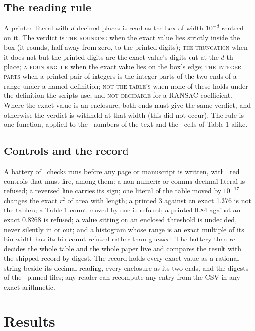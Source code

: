 \documentclass[preprint,11pt,authoryear]{elsarticle}
\begin{document}
\subsection{The reading rule}\label{sec:rule}
A printed literal with $d$ decimal places is read as the box of width $10^{-d}$ centred on it. The verdict is \textsc{the rounding} when the exact value lies strictly inside the box (it rounds, half away from zero, to the printed digits); \textsc{the truncation} when it does not but the printed digits are the exact value's digits cut at the $d$-th place; \textsc{a rounding tie} when the exact value lies on the box's edge; \textsc{the integer parts} when a printed pair of integers is the integer parts of the two ends of a range under a named definition; \textsc{not the table's} when none of these holds under the definition the scripts use; and \textsc{not decidable} for a RANSAC coefficient. Where the exact value is an enclosure, both ends must give the same verdict, and otherwise the verdict is withheld at that width (this did not occur). The rule is one function, applied to the \ItemsTotal\ numbers of the text and the \TOneCells\ cells of Table 1 alike.

\subsection{Controls and the record}
A battery of \BatteryChecks\ checks runs before any page or manuscript is written, with \BatteryReds\ red controls that must fire, among them: a non-numeric or comma-decimal literal is refused; a reversed line carries its sign; one literal of the table moved by $10^{-17}$ changes the exact $r^2$ of area with length; a printed 3 against an exact 1.376 is not the table's; a Table 1 count moved by one is refused; a printed 0.84 against an exact 0.8268 is refused; a value sitting on an enclosed threshold is undecided, never silently in or out; and a histogram whose range is an exact multiple of its bin width has its bin count refused rather than guessed. The battery then re-decides the whole table and the whole paper live and compares the result with the shipped record by digest. The record holds every exact value as a rational string beside its decimal reading, every enclosure as its two ends, and the digests of the \PinnedFiles\ pinned files; any reader can recompute any entry from the CSV in any exact arithmetic.

\section{Results}\label{sec:results}
\end{document}
